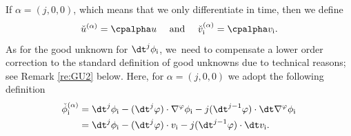 If $\alpha=(j,0,0)$, which means that we only differentiate in time, then we define
\[
\check{u}^{(\alpha)} = \cpalpha u
\quad\mbox{ and }\quad
\check{v}_\mathrm{i}^{(\alpha)} = \cpalpha v_\mathrm{i}.
\]
As for the good unknown for $\dt^j\phi_\mathrm{i}$, we~need to compensate a lower order correction to the standard definition of good unknowns due to technical reasons; see Remark \ref{re:GU2} below.
Here, for $\alpha=(j,0,0)$ we adopt the following definition
\begin{align*}
\check{\phi}_\mathrm{i}^{(\alpha)}
&= \dt^j \phi_\mathrm{i}-(\dt^j\varphi)\cdot\nabla^\varphi\phi_\mathrm{i}-j(\dt^{j-1}\varphi)\cdot\dt\nabla^\varphi\phi_\mathrm{i} \\
&= \dt^j \phi_\mathrm{i}-(\dt^j\varphi)\cdot v_\mathrm{i}-j(\dt^{j-1}\varphi)\cdot\dt v_\mathrm{i}.
\end{align*}

